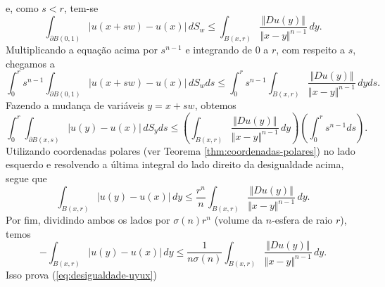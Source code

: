 \documentclass[a4paper, 11pt]{book}
\theoremstyle{definition}
\newcommand{\sint}{-\!\!\!\!\!\!\int}
\begin{document}
\begin{prf}
\[    \]
    e, como $s < r$, tem-se
    \[
        \int_{\partial B(0,1)} |u(x + sw) - u(x)|\,dS_w \leqslant   \int_{B(x,r)} \frac{\Vert Du(y) \Vert}{\Vert x - y \Vert^{n-1}} \,dy.
    \]
    Multiplicando a equação acima por $s^{n-1}$ e integrando de $0$ a $r$, com respeito a $s$, chegamos a
    \[
        \int_0^r s^{n-1} \int_{\partial B(0,1)} |u(x + sw) - u(x)| \,dS_wds \leqslant \int_0^r s^{n-1} \int_{B(x,r)} \frac{\Vert Du(y) \Vert}{\Vert x - y \Vert^{n-1}} \,dyds.
    \]
    Fazendo a mudança de variáveis $y = x + sw$, obtemos
    \[
        \int_0^r \int_{\partial B(x,s)} |u(y) - u(x)|\, dS_yds \leqslant \left( \int_{B(x,r)} \frac{\Vert Du(y) \Vert}{\Vert x - y \Vert^{n-1}} \,dy \right) \left( \int_0^r s^{n-1} ds \right).
    \]
    Utilizando coordenadas polares (ver Teorema \ref{thm:coordenadas-polares}) no lado esquerdo e resolvendo a última integral do lado direito da desigualdade acima, segue que
    \[
        \int_{B(x,r)} |u(y) - u(x)|\,dy \leqslant \frac{r^n}{n} \int_{B(x,r)} \frac{\Vert Du(y) \Vert}{\Vert x - y \Vert^{n-1}} \,dy.
    \]
    Por fim, dividindo ambos os lados por $\sigma(n) r^n$ (volume da $n$-esfera de raio $r$), temos
    \[
        \sint_{B(x,r)} |u(y) - u(x)| \,dy \leqslant \frac{1}{n\sigma(n)} \int_{B(x,r)} \frac{\Vert Du(y) \Vert}{\Vert x-y \Vert^{n-1}} \,dy.
    \]
    Isso prova (\ref{eq:desigualdade-uyux})


\end{prf}
\end{document}
